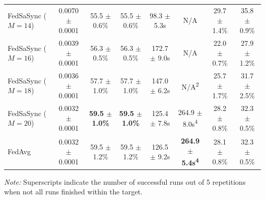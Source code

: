 \begin{table}[t]
{\begin{tabular}{lccccccc}
FedSaSync ($M = 14$) & 0.0070 $\pm$ 0.0001 & 55.5 $\pm$ 0.6\% & 55.5 $\pm$ 0.6\% & 98.3 $\pm$ 5.3s & N/A & 29.7 $\pm$ 1.4\% & 35.8 $\pm$ 0.9\% \\
FedSaSync ($M = 16$) & 0.0039 $\pm$ 0.0001 & 56.3 $\pm$ 0.5\% & 56.3 $\pm$ 0.5\% & 172.7 $\pm$ 9.0s & N/A & 22.0 $\pm$ 0.7\% & 27.9 $\pm$ 1.2\% \\
FedSaSync ($M = 18$) & 0.0036 $\pm$ 0.0001 & 57.7 $\pm$ 1.0\% & 57.7 $\pm$ 1.0\% & 147.0 $\pm$ 6.2s & N/A\textsuperscript{2} & 25.7 $\pm$ 1.7\% & 31.7 $\pm$ 2.5\% \\
FedSaSync ($M = 20$) & 0.0032 $\pm$ 0.0001 & \textbf{59.5 $\pm$ 1.0\%} & \textbf{59.5 $\pm$ 1.0\%} & 125.4 $\pm$ 7.8s & 264.9 $\pm$ 8.0s\textsuperscript{4} & 28.2 $\pm$ 0.8\% & 32.3 $\pm$ 0.5\% \\
FedAvg & 0.0032 $\pm$ 0.0001 & 59.5 $\pm$ 1.2\% & 59.5 $\pm$ 1.2\% & 126.5 $\pm$ 9.2s & \textbf{264.9 $\pm$ 5.4s\textsuperscript{4}} & 28.1 $\pm$ 0.8\% & 32.3 $\pm$ 0.5\% \\
\hline
\end{tabular}%
}
\par\vspace{0.8em}
\raggedright \footnotesize \textit{Note:} Superscripts indicate the number of successful runs out of 5 repetitions when not all runs finished within the target.
\end{table}